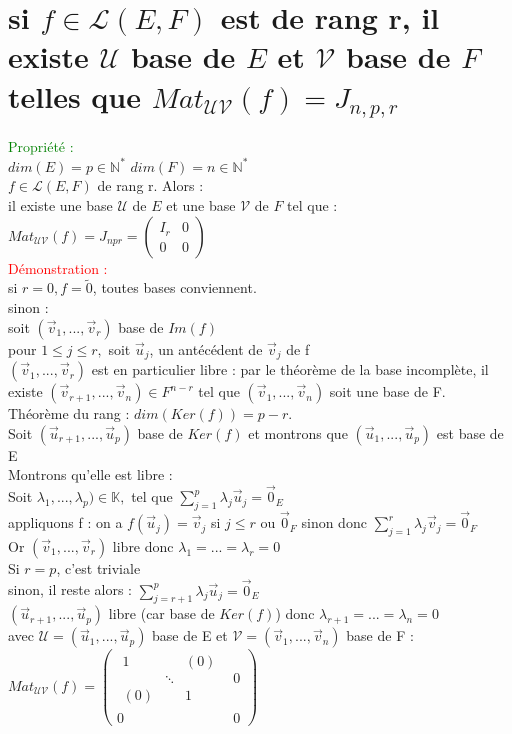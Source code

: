 \documentclass{article}
\begin{document}
        \section{si $f \in \mathcal L(E,F)$ est de rang r, il existe $\mathcal U$ base de $E$ et $\mathcal V$ base de $F$ telles que $Mat_{\mathcal{UV}}(f)=J_{n,p,r}$}
				\textcolor{green}{Propriété :} \\
				$dim(E)=p \in \mathbb N^*$ $dim(F)=n \in \mathbb N^*$ \\
				$f \in \mathcal L (E,F)$ de rang r. Alors : \\
				il existe une base $\mathcal U$ de $E$ et une base $\mathcal V$ de $F$ tel que :  $Mat_{\mathcal{UV}}(f)=J_{npr}=\left(\begin{array}{c|c}I _r& 0 \\ \hline0 & 0 \end{array}\right)$ \\
				\textcolor{red}{Démonstration :} \\
				si $r=0, f=\tilde{0}$, toutes bases conviennent. \\
				sinon : \\
				soit $(\vec v_1,..., \vec v_r)$ base de $Im(f)$ \\
				pour $1 \leq j \leq r, $ soit $\vec u_j$, un antécédent de $\vec v_j$ de f \\
				$(\vec v_1,..., \vec v_r)$ est en particulier libre : par le théorème de la base incomplète, il existe $(\vec v_{r+1},..., \vec v_n) \in F^{n-r}$ tel que $(\vec v_1,...,\vec v_n)$ soit une base de F. \\
				Théorème du rang : $dim(Ker(f))=p-r$. \\
				Soit $(\vec u_{r+1},..., \vec u_p)$ base de $Ker(f)$ et montrons que $(\vec u_1,..., \vec u_p)$ est base de E \\
				Montrons qu'elle est libre : \\
				Soit $\lambda_1,...,\lambda_p) \in \mathbb K,$ tel que $\sum_{j=1}^p \lambda_j \vec u_j = \vec 0_E$ \\
				appliquons f : on a $f(\vec u_j)=\vec v_j$ si $j \leq r$ ou $\vec 0_F$ sinon donc $\sum_{j=1}^r \lambda_j \vec v_j=\vec 0_F$ \\
				Or $(\vec v_1,..., \vec v_r)$ libre donc $\lambda_1=...= \lambda_r=0$ \\
				Si $r=p$, c'est triviale \\
				sinon, il reste alors : $\sum_{j=r+1}^p \lambda_j \vec u_j= \vec 0_E$ \\
				$(\vec u_{r+1},...,\vec u_p)$ libre (car base de $Ker(f)$) donc $\lambda_{r+1}=...= \lambda_n= 0$ \\
				avec $\mathcal U= (\vec u_1,..., \vec u_p)$ base de E et $\mathcal V=(\vec v_1,..., \vec v_n)$ base de F : \\
				$Mat_{\mathcal{UV}}(f)=\left(\begin{array}{c|c}\begin{matrix}
				1 &  & (0) \\  & \ddots & \\ (0) & & 1
				\end{matrix} & 0 \\ \hline0 & 0 \end{array}\right)$
\end{document}
